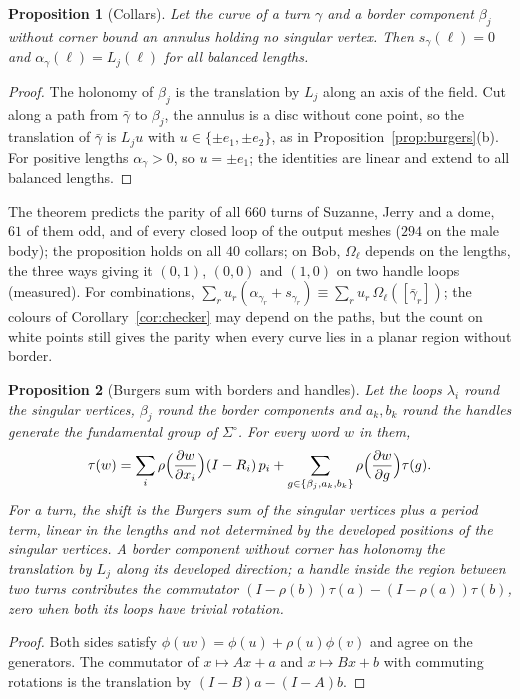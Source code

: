 \documentclass[11pt,a4paper]{article}
\newtheorem{proposition}{Proposition}
\newcommand{\shift}{s}
\begin{document}
\begin{proposition}[Collars]\label{prop:collar}
Let the curve of a turn $\gamma$ and a border component $\beta_j$ without
corner bound an annulus holding no singular vertex. Then $\shift_\gamma(\ell)
= 0$ and $\alpha_\gamma(\ell) = L_j(\ell)$ for all balanced lengths.
\end{proposition}
\begin{proof}
The holonomy of $\beta_j$ is the translation by $L_j$ along an axis of the
field. Cut along a path from $\bar\gamma$ to $\beta_j$, the annulus is a disc
without cone point, so the translation of $\bar\gamma$ is $L_j u$ with $u \in
\{\pm e_1, \pm e_2\}$, as in Proposition~\ref{prop:burgers}(b). For positive
lengths $\alpha_\gamma > 0$, so $u = \pm e_1$; the identities are linear and
extend to all balanced lengths.
\end{proof}

The theorem predicts the parity of all $660$ turns of Suzanne, Jerry and a
dome, $61$ of them odd, and of every closed loop of the output meshes ($294$
on the male body); the proposition holds on all $40$ collars; on Bob,
$\Omega_\ell$ depends on the lengths, the three ways giving it $(0, 1)$, $(0,
0)$ and $(1, 0)$ on two handle loops (measured). For combinations,
$\sum_r u_r(\alpha_{\gamma_r} + \shift_{\gamma_r}) \equiv \sum_r u_r\,
\Omega_\ell([\bar\gamma_r])$; the colours of Corollary~\ref{cor:checker} may
depend on the paths, but the count on white points still gives the parity when
every curve lies in a planar region without border.

\begin{proposition}[Burgers sum with borders and handles]\label{prop:burgers-any}
Let the loops $\lambda_i$ round the singular vertices, $\beta_j$ round the
border components and $a_k, b_k$ round the handles generate the fundamental
group of $\Sigma^\circ$. For every word $w$ in them,
\[
  \tau(w) = \sum_i \rho\Bigl(\frac{\partial w}{\partial x_i}\Bigr)(I - R_i)\,p_i
  + \sum_{g \in \{\beta_j, a_k, b_k\}} \rho\Bigl(\frac{\partial w}{\partial g}\Bigr)\tau(g).
\]
For a turn, the shift is the Burgers sum of the singular vertices plus a
\emph{period term}, linear in the lengths and not determined by the developed
positions of the singular vertices. A border component without corner has
holonomy the translation by $L_j$ along its developed direction; a handle
inside the region between two turns contributes the commutator $(I -
\rho(b))\tau(a) - (I - \rho(a))\tau(b)$, zero when both its loops have trivial
rotation.
\end{proposition}
\begin{proof}
Both sides satisfy $\phi(uv) = \phi(u) + \rho(u)\phi(v)$ and agree on the
generators. The commutator of $x \mapsto Ax + a$ and $x \mapsto Bx + b$ with
commuting rotations is the translation by $(I - B)a - (I - A)b$.
\end{proof}
\end{document}

